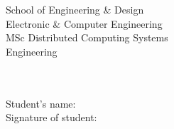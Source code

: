 \begin{titlepage}
    \begin{center}
        \large  
		\vspace*{1cm}
		{School of Engineering \& Design}\\
		{Electronic \& Computer Engineering}\\
		\vspace{1.2cm}
		{MSc Distributed Computing Systems}\\
		{Engineering}\\
		\vspace{2cm}
		\huge
		{\myUni}\\
		\vspace{2.5cm}
		\Huge
		\begingroup
			\color{Maroon}{\myTitle}\\
		\endgroup	
		\vspace{4.5cm}
		\large
	\begin{flushleft}
		{Student's name: }\\
		\vspace{0.5cm}
	   	{Signature of student: }\\
	 \end{flushleft}
		
		\vfill
		
		\normalsize

    \end{center}
\end{titlepage}        
